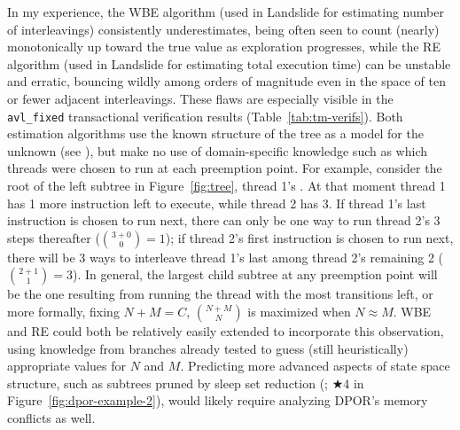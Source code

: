 In my experience,
the WBE algorithm (used in Landslide for estimating number of interleavings) consistently underestimates,
being often seen to count (nearly) monotonically up toward the true value as exploration progresses,
while the RE algorithm (used in Landslide for estimating total execution time) can be unstable and erratic,
bouncing wildly among orders of magnitude even in the space of ten or fewer adjacent interleavings.
These flaws are especially visible in the {\tt avl\_fixed} transactional verification results (Table~\ref{tab:tm-verifs}).
Both estimation algorithms
use the known structure of the tree as a model for the unknown
(see \sect{\ref{sec:landslide-estimate}}),
but make no use of domain-specific knowledge such as which threads were chosen to run at each preemption point.
For example, consider the root of the left subtree in Figure~\ref{fig:tree},
thread 1's .
At that moment thread 1 has 1 more instruction left to execute, while thread 2 has 3.
If thread 1's last instruction is chosen to run next,
there can only be one way to run thread 2's 3 steps thereafter (${3+0 \choose 0} = 1$);
if thread 2's first instruction is chosen to run next,
there will be 3 ways to interleave thread 1's last among thread 2's remaining 2 (${2+1 \choose 1} = 3$).
In general, the largest child subtree at any preemption point will be the one resulting from running the thread with the most transitions left,
or more formally, fixing $N+M=C$, ${N+M \choose N}$ is maximized when $N \approx M$.
WBE and RE could both be relatively easily extended to incorporate this observation,
using knowledge from branches already tested to guess (still heuristically) appropriate values for $N$ and $M$.
Predicting more advanced aspects of state space structure,
such as subtrees pruned by sleep set reduction
(\sect{\ref{sec:landslide-sleepsets}}; $\bigstar$4 in Figure~\ref{fig:dpor-example-2}),
would likely require analyzing DPOR's memory conflicts as well.

